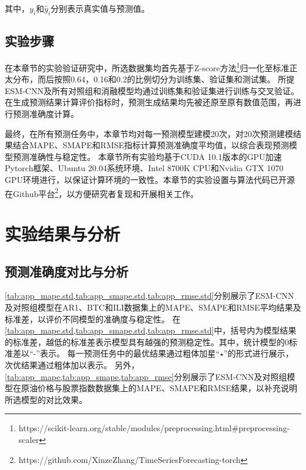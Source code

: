 其中，$y_i$和$\hat y_i$分别表示真实值与预测值。

\subsection{实验步骤}
在本章节的实验验证研究中，所选数据集均首先基于Z-score方法\footnote{https://scikit-learn.org/stable/modules/preprocessing.html\#preprocessing-scaler}归一化至标准正太分布，而后按照0.64，0.16和0.2的比例切分为训练集、验证集和测试集。
所提ESM-CNN及所有对照组和消融模型均通过训练集和验证集进行训练与交叉验证。
在生成预测结果计算评价指标时，预测生成结果均先被还原至原有数值范围，再进行预测准确度计算。

最终，在所有预测任务中，本章节均对每一预测模型建模20次，对20次预测建模结果结合MAPE、SMAPE和RMSE指标计算预测准确度平均值，以综合表现预测模型预测准确性与稳定性。
本章节所有实验均基于CUDA 10.1版本的GPU加速Pytorch框架\cite{paszkePytorch2019}、Ubuntu 20.04系统环境、Intel 8700K CPU和Nvidia GTX 1070 GPU环境进行，以保证计算环境的一致性。本章节的实验设置与算法代码已开源在Github平台\footnote{https://github.com/XinzeZhang/TimeSeriesForecasting-torch}，以方便研究者复现和开展相关工作。



\section{实验结果与分析\label{sec:esm.ana}}
\subsection{预测准确度对比与分析}

\cref{tab:app_mape.std,tab:app_smape.std,tab:app_rmse.std}分别展示了ESM-CNN及对照组模型在AR1、BTC和ILI数据集上的MAPE、SMAPE和RMSE平均结果及标准差，以评价不同模型的准确度与稳定性。
在\cref{tab:app_mape.std,tab:app_smape.std,tab:app_rmse.std}中，括号内为模型结果的标准差，越低的标准差表示模型具有越强的预测稳定性。其中，统计模型的0标准差以“-”表示。
每一预测任务中的最优结果通过粗体加星“\(\star\)”的形式进行展示，次优结果通过粗体加以表示。
另外，\cref{tab:app_mape,tab:app_smape,tab:app_rmse}分别展示了ESM-CNN及对照组模型在原油价格与股票指数数据集上的MAPE、SMAPE和RMSE结果，以补充说明所选模型的对比效果。





